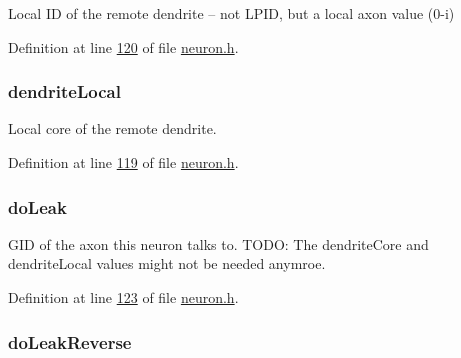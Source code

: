 Local I\+D of the remote dendrite -- not L\+P\+I\+D, but a local axon value (0-\/i) 



Definition at line \hyperlink{neuron_8h_source_l00120}{120} of file \hyperlink{neuron_8h_source}{neuron.\+h}.

\hypertarget{structneuron_state_a73e5b16411af572181411b8fd8d5117d}{}
\subsubsection[{dendrite\+Local}]{ dendrite\+Local}\label{structneuron_state_a73e5b16411af572181411b8fd8d5117d}


Local core of the remote dendrite. 



Definition at line \hyperlink{neuron_8h_source_l00119}{119} of file \hyperlink{neuron_8h_source}{neuron.\+h}.

\hypertarget{structneuron_state_aa430f424f34dc59dc27736e27ec61320}{}
\subsubsection[{do\+Leak}]{ do\+Leak}\label{structneuron_state_aa430f424f34dc59dc27736e27ec61320}


G\+I\+D of the axon this neuron talks to. T\+O\+D\+O\+: The dendrite\+Core and dendrite\+Local values might not be needed anymroe. 



Definition at line \hyperlink{neuron_8h_source_l00123}{123} of file \hyperlink{neuron_8h_source}{neuron.\+h}.

\hypertarget{structneuron_state_af4ded7f575b64ada6c0a6664f638307c}{}
\subsubsection[{do\+Leak\+Reverse}]{ do\+Leak\+Reverse}\label{structneuron_state_af4ded7f575b64ada6c0a6664f638307c}


